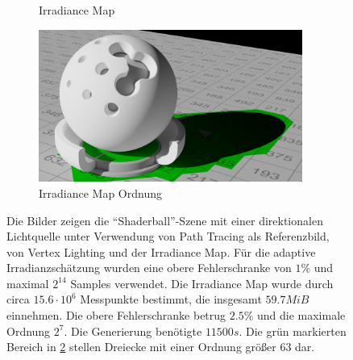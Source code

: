 \begin{figure}[H]
\begin{subfigure}[b]{0.5\textwidth}
			\caption{Irradiance Map}
			\label{subfig:irrmap-shaderball-irrmap}
		\end{subfigure}
		\begin{subfigure}[b]{0.5\textwidth}
			\center
			\includegraphics[width=0.95\textwidth]{pic/irrmap-shaderball-irrmap-order.png}
			\caption{Irradiance Map Ordnung}
			\label{subfig:irrmap-shaderball-irrmap-order}
		\end{subfigure}
		\caption[Irradiance-Map der \enquote{Shaderball}-Szene mit direktionaler Lichtquelle]{Die Bilder zeigen die \enquote{Shaderball}-Szene mit einer direktionalen Lichtquelle unter Verwendung von Path Tracing als Referenzbild, von Vertex Lighting und der Irradiance Map. Für die adaptive Irradianzschätzung wurden eine obere Fehlerschranke von $1\unit{\%}$ und maximal $2^{14}$ Samples verwendet. Die Irradiance Map wurde durch circa $15.6\cdot10^6$ Messpunkte bestimmt, die insgesamt $59.7\unit{MiB}$ einnehmen. Die obere Fehlerschranke betrug $2.5\unit{\%}$ und die maximale Ordnung $2^7$. Die Generierung benötigte $11500\unit{s}$. Die grün markierten Bereich in \ref{subfig:irrmap-shaderball-irrmap-order} stellen Dreiecke mit einer Ordnung größer $63$ dar.}
		\label{fig:irrmap-shaderball}
	\end{figure}

